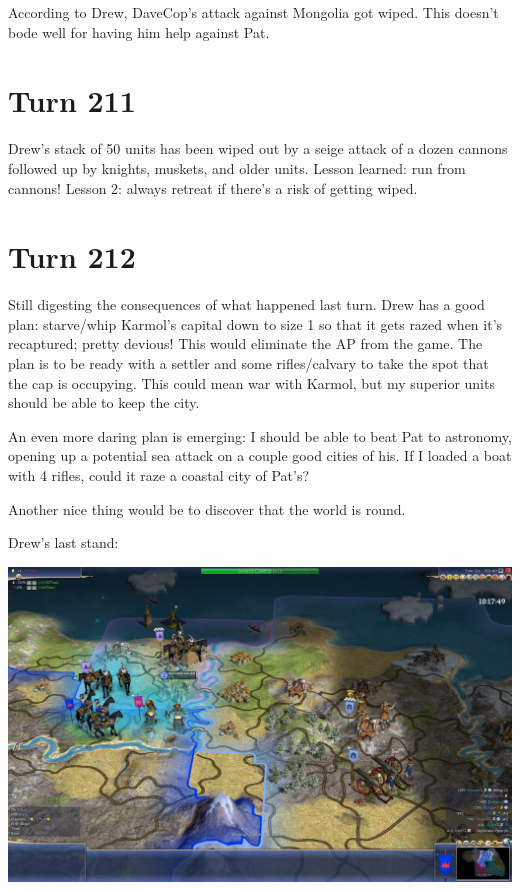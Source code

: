 \documentclass[10pt]{article}
\begin{document}
According to Drew, DaveCop's attack against Mongolia got wiped. This doesn't bode well for having him help against Pat.

\section*{Turn 211}

Drew's stack of 50 units has been wiped out by a seige attack of a
dozen cannons followed up by knights, muskets, and older units. Lesson
learned: run from cannons! Lesson 2: always retreat if there's a risk
of getting wiped.

\section*{Turn 212}

Still digesting the consequences of what happened last turn. Drew has
a good plan: starve/whip Karmol's capital down to size 1 so that it
gets razed when it's recaptured; pretty devious! This would eliminate
the AP from the game. The plan is to be ready with a settler and some
rifles/calvary to take the spot that the cap is occupying. This could
mean war with Karmol, but my superior units should be able to keep the
city.

An even more daring plan is emerging: I should be able to beat Pat to
astronomy, opening up a potential sea attack on a couple good cities
of his. If I loaded a boat with 4 rifles, could it raze a coastal city
of Pat's?

Another nice thing would be to discover that the world is round.

Drew's last stand:

\includegraphics[width=1.0\textwidth]{turn214}
\end{document}
